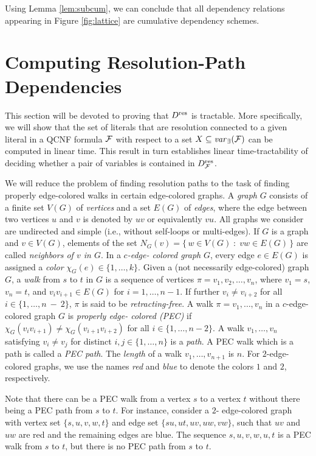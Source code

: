 \documentclass{llncs}
\newcommand{\Dres}{D^{\text{\normalfont res}}}
\def\hy{\hbox{-}\nobreak\hskip0pt} \newcommand{\ellipsis}{$\dots$}
\newcommand{\SB}{\{\,} \newcommand{\SM}{\;{:}\;} \newcommand{\SE}{\,\}}
\begin{document}
Using Lemma \ref{lem:subcum}, we can conclude that all dependency relations
appearing in Figure \ref{fig:lattice} are cumulative dependency schemes.
\section{Computing Resolution\hy Path Dependencies} \label{sec:tractability}
This section will be devoted to proving that $\Dres$ is tractable. More
specifically, we will show that the set of literals that are resolution
connected to a given literal in a QCNF formula $\mathcal{F}$ with respect to a set $X
\subseteq \mathit{var}_{\exists}(\mathcal{F})$ can be computed in linear time. This result in
turn establishes linear time\hy tractability of deciding whether a pair of
variables is contained in $\Dres_{\FFF}$.

We will reduce the problem of finding resolution paths to the task of finding
properly edge\hy colored walks in certain edge\hy colored graphs. A
\emph{graph} $G$ consists of a finite set $V(G)$ of \emph{vertices} and a set
$E(G)$ of \emph{edges}, where the edge between two vertices $u$ and $v$ is
denoted by $uv$ or equivalently $vu$. All graphs we consider are undirected
and simple (i.e., without self\hy loops or multi\hy edges). If $G$ is a graph
and $v \in V(G)$, elements of the set $N_G(v) = \SB w \in V(G) \SM vw \in E(G)
\SE$ are called \emph{neighbors of $v$ in $G$}. In a \emph{$c$\hy edge\hy
  colored graph} $G$, every edge $e \in E(G)$ is assigned a \emph{color}
$\chi_{G}(e) \in \{ 1, \dots, k \}$. Given a (not necessarily edge\hy colored)
graph $G$, a \emph{walk} from $s$ to $t$ in $G$ is a sequence of vertices $\pi
= v_1,v_2, \dots, v_n$, where $v_1 = s$, $v_n = t$, and $v_iv_{i+1} \in E(G)$
for $i=1,\dots,n-1$. If further $v_i \neq v_{i+2}$ for all $i \in \{1, \dots,
n~-~2 \}$, $\pi$ is said to be \emph{retracting\hy free}. A walk $\pi =
v_1,\dots,v_n$ in a $c$\hy edge\hy colored graph $G$ is \emph{properly edge\hy
  colored (PEC)} if $\chi_G(v_iv_{i+1}) \neq \chi_G(v_{i+1}v_{i+2})$ for all
$i \in \{ 1,\dots, n - 2 \}$. A walk $v_1,\dots,v_n$ satisfying $v_i \neq v_j$
for distinct $i,j \in \{1,\dots,n\}$ is a \emph{path}. A PEC walk which is a
path is called a \emph{PEC path}. The \emph{length} of a
walk $v_1,\dots,v_{n+1}$ is $n$. For $2$\hy edge\hy colored graphs, we use the
names \emph{red} and \emph{blue} to denote the colors $1$ and $2$,
respectively.

Note that there can be a PEC walk from a vertex $s$ to a vertex $t$ without
there being a PEC path from $s$ to $t$. For instance, consider a $2$\hy
edge\hy colored graph with vertex set $\{s,u,v,w,t\}$ and edge set
$\{su,ut,uv,uw,vw\}$, such that $uv$ and $uw$ are red and the remaining edges
are blue. The sequence $s,u,v,w,u,t$ is a PEC walk from $s$ to $t$, but there
is no PEC path from $s$ to $t$.
\end{document}
